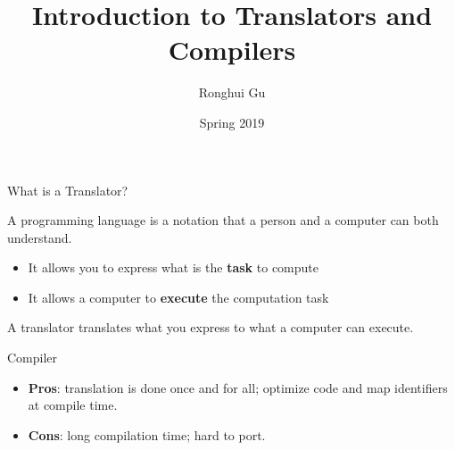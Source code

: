 \documentclass{plt}
\title{Introduction to Translators and Compilers}
\author{Ronghui Gu}
\institute{Columbia University}
\date{Spring 2019}
\begin{document}
\frame{\titlepage
}

\begin{frame}[fragile]{What is a Translator?}

A programming language is a notation that  a person and a computer can both understand.
\begin{itemize}

\item It allows you to express what is the \textbf{task} to compute

\item It allows a computer to \textbf{execute} the computation task

\end{itemize}


\alert{A translator translates what you express to what a computer can execute.}

\end{frame}


\begin{frame}[fragile,t]{Compiler}

\begin{center}
\end{center}


\begin{itemize}

\item \textbf{Pros}: translation is done once and for all; 
optimize code and map identifiers at compile time.

\item \textbf{Cons}: long compilation time; hard to port.

\end{itemize}

\end{frame}
\end{document}
